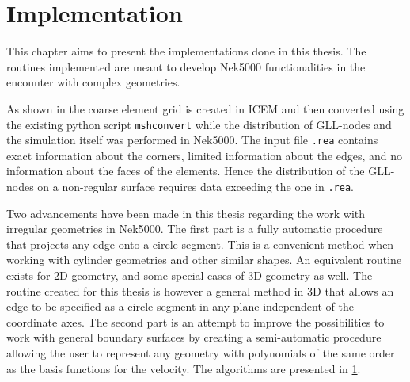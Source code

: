 
\chapter{Implementation} %

\label{implementation} %






This chapter aims to present the implementations done in this thesis. 
The routines implemented are meant to develop Nek5000 functionalities 
in the encounter with complex geometries. 

As shown in  the coarse element grid is created
in ICEM and then converted using the existing python script \verb|mshconvert| while the
distribution of GLL-nodes and the simulation itself was performed in Nek5000.
The input file \verb|.rea| contains exact information about the corners,
limited information about the edges, and no information about the faces of the elements.
Hence the distribution of the GLL-nodes on a non-regular surface requires data exceeding the one in \verb|.rea|.

Two advancements have been made in this thesis regarding the work with irregular geometries in Nek5000.
The first part is a fully automatic procedure that projects any edge onto a circle segment. This is a
convenient method when working with cylinder geometries and other similar shapes. An equivalent routine 
exists for 2D geometry, and some special cases of 3D geometry as well. The routine created for this thesis is 
however a general method in 3D that allows an edge to be specified as a circle segment in any plane independent of the coordinate axes.
The second part is an attempt to improve the possibilities to work with general boundary surfaces by creating a semi-automatic procedure allowing 
the user to represent any geometry with polynomials of the same order as the basis functions for the velocity.
The algorithms are presented in \cref{implementation}. 

